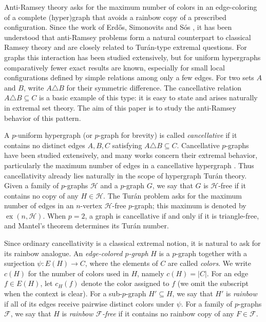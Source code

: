 \documentclass[10pt,a4paper]{article}
\theoremstyle{definition}
\newcommand{\cF}{\mathcal{F}}
\newcommand{\cH}{\mathcal{H}}
\DeclareMathOperator{\ex}{ex}
\begin{document}
Anti-Ramsey theory asks for the maximum number of colors in an edge-coloring of a complete (hyper)graph that avoids a rainbow copy of a prescribed configuration.
Since the work of Erd\H{o}s, Simonovits and S\'os \cite{erdos1975}, it has been understood that anti-Ramsey problems form a natural counterpart to classical Ramsey theory and are closely related to Tur\'an-type extremal questions.
For graphs this interaction has been studied extensively, but for uniform hypergraphs comparatively fewer exact results are known, especially for small local configurations defined by simple relations among only a few edges.
For two sets $A$ and $B$, write $A\triangle B$ for their symmetric difference.
The cancellative relation $A\triangle B\subseteq C$ is a basic example of this type: it is easy to state and arises naturally in extremal set theory.
The aim of this paper is to study the anti-Ramsey behavior of this pattern.

A $p$-uniform hypergraph (or $p$-graph for brevity) is called {\it cancellative} if it contains no distinct edges $A,B,C$ satisfying $A\triangle B\subseteq C$.
Cancellative $p$-graphs have been studied extensively, and many works concern their extremal behavior, particularly the maximum number of edges in a cancellative hypergraph \cite{bollobas1974,keevash2004,pikhurko2008}.
Thus cancellativity already lies naturally in the scope of hypergraph Tur\'an theory.
Given a family of $p$-graphs $\cH$ and a $p$-graph $G$, we say that $G$ is $\cH$-free if it contains no copy of any $H\in\cH$.
The Tur\'an problem asks for the maximum number of edges in an $n$-vertex $\cH$-free $p$-graph; this maximum is denoted by $\ex(n,\cH)$.
When $p=2$, a graph is cancellative if and only if it is triangle-free, and Mantel's theorem \cite{mantel1907} determines its Tur\'an number.

Since ordinary cancellativity is a classical extremal notion, it is natural to ask for its rainbow analogue.
An {\it edge-colored $p$-graph} $H$ is a $p$-graph together with a surjection $\psi\colon E(H)\to C$, where the elements of $C$ are called {\it colors}.
We write $c(H)$ for the number of colors used in $H$, namely $c(H)=|C|$. For an edge $f\in E(H)$, let $c_H(f)$ denote the color assigned to $f$ (we omit the subscript when the context is clear).
For a sub-$p$-graph $H'\subseteq H$, we say that $H'$ is {\it rainbow} if all of its edges receive pairwise distinct colors under $\psi$. For a family of $p$-graphs $\cF$, we say that $H$ is {\it rainbow $\cF$-free} if it contains no rainbow copy of any $F\in\cF$.
\end{document}
